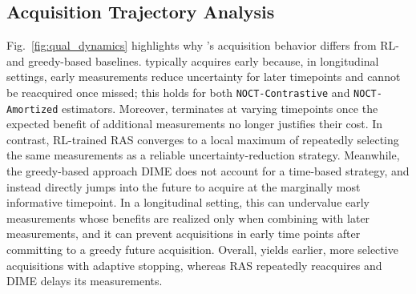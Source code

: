\subsection{Acquisition Trajectory Analysis}
Fig.~\ref{fig:qual_dynamics} highlights why \texttt{\OurMethod}'s acquisition behavior differs from RL- and greedy-based baselines. \texttt{\OurMethod} typically acquires early because, in longitudinal settings, early measurements reduce uncertainty for later timepoints and cannot be reacquired once missed; this holds for both \texttt{NOCT-Contrastive} and \texttt{NOCT-Amortized} estimators. Moreover, \texttt{\OurMethod} terminates at varying timepoints once the expected benefit of additional measurements no longer justifies their cost. In contrast, RL-trained RAS %
converges to a local maximum of repeatedly selecting the same measurements as a reliable uncertainty-reduction strategy. Meanwhile, the greedy-based approach DIME does not account for a time-based strategy, and instead directly jumps into the future to acquire at the marginally most informative timepoint.
In a longitudinal setting, this can undervalue early measurements whose benefits are realized only when combining with later measurements, and it can prevent acquisitions in early time points after committing to a greedy future acquisition. 
Overall, \texttt{\OurMethod} yields earlier, more selective acquisitions with adaptive stopping, whereas RAS repeatedly reacquires and DIME delays its measurements.



